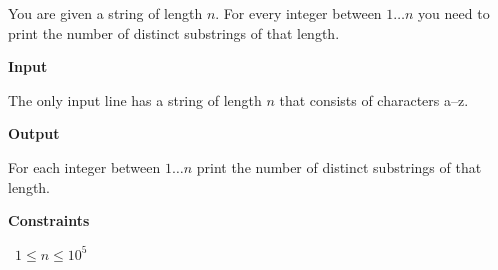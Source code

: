 You are given a string of length $n$. For every integer between $1 \ldots n$ you need to print the number of distinct substrings of that length.

\vspace{0.3cm}\noindent\textbf{Input}

The only input line has a string of length $n$ that consists of characters a–z.

\vspace{0.3cm}\noindent\textbf{Output}

For each integer between $1 \ldots n$ print the number of distinct substrings of that length.

\vspace{0.3cm}\noindent\textbf{Constraints}

\textbullet\ $1 \le n \le 10^5$